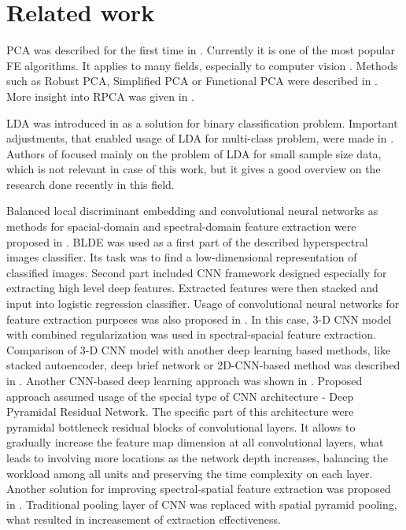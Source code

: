 \documentclass[a4paper, 10 pt, journal]{ieeeconf}
\begin{document}
\section{Related work}
PCA was described for the first time in \cite{PCA}. Currently it is one of the most popular FE algorithms. It applies to many fields, especially to computer vision \cite{PCA_book}. Methods such as Robust PCA, Simplified PCA or Functional PCA were described in \cite{PCA_recent}. More insight into RPCA was given in \cite{RPCA}.

LDA was introduced in \cite{LDA} as a solution for binary classification problem. Important adjustments, that enabled usage of LDA for multi-class problem, were made in \cite{multi_LDA}.  Authors of \cite{LDA_recent} focused mainly on the problem of LDA for small sample size data, which is not relevant in case of this work, but it gives a good overview on the research done recently in this field.

Balanced local discriminant embedding and convolutional neural networks as methods for spacial-domain and spectral-domain feature extraction were proposed in \cite{blde-cnn}. BLDE was used as a first part of the described hyperspectral images classifier. Its task was to find a low-dimensional representation of classified images. Second part included CNN framework designed especially for extracting high level deep features. Extracted features were then stacked and input into logistic regression classifier. Usage of convolutional neural networks for feature extraction purposes was also proposed in \cite{cnn}. In this case, 3-D CNN model with combined regularization was used in spectral-spacial feature extraction. Comparison of 3-D CNN model with another deep learning based methods, like stacked autoencoder, deep brief network or 2D-CNN-based method was described in \cite{cnn2}. Another CNN-based deep learning approach was shown in \cite{cnn3}. Proposed approach assumed usage of the special type of CNN architecture - Deep Pyramidal Residual Network. The specific part of this architecture were pyramidal bottleneck residual blocks of convolutional layers. It allows to gradually increase the feature map dimension at all convolutional layers, what leads to involving more locations as the network depth increases, balancing the workload among all units and preserving the time complexity on each layer. Another solution for improving spectral-spatial feature extraction was proposed in \cite{cnn4}. Traditional pooling layer of CNN was replaced with spatial pyramid pooling, what resulted in increasement of extraction effectiveness.
\end{document}

